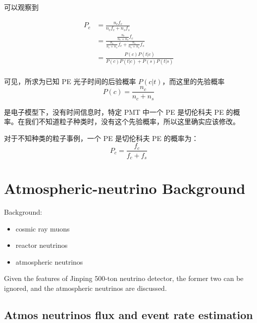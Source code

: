 \documentclass[12pt]{article}
\begin{document}
可以观察到

\begin{equation}
    \begin{aligned}
        P_c & = \frac{n_c f_c}{n_c f_c + n_s f_s} \\
        & = \frac{\frac{n_c}{n_c + n_s} f_c}{\frac{n_c}{n_c + n_s} f_c + \frac{n_c}{n_c + n_s} f_s} \\
        & = \frac{P(c) P(t|c)}{P(c) P(t|c) + P(s) P(t|s)} \\
    \end{aligned}
\end{equation}



可见，所求为已知 PE 光子时间的后验概率 $P(c|t)$，而这里的先验概率
\begin{equation}
    P(c) = \frac{n_c}{n_c + n_s}
\end{equation}

是电子模型下，没有时间信息时，特定 PMT 中一个 PE 是切伦科夫 PE 的概率。在我们不知道粒子种类时，没有这个先验概率，所以这里确实应该修改。

对于不知种类的粒子事例，一个 PE 是切伦科夫 PE 的概率为：
\begin{equation}
    P_c = \frac{f_c}{f_c + f_s}
\end{equation}

\newpage
\section{Atmospheric-neutrino Background}
Background:
\begin{itemize}
    \item cosmic ray muons
    \item reactor neutrinos
    \item atmospheric neutrinos
\end{itemize}

Given the features of Jinping 500-ton neutrino detector, the former two can be ignored, and the atmospheric neutrinos are discussed.

\subsection{Atmos neutrinos flux and event rate estimation}
\label{sec:atmos-rate}
\end{document}
